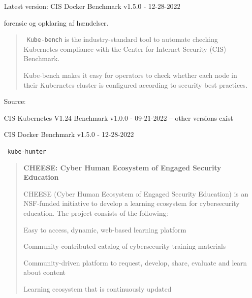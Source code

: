 \documentclass[Screen16to9,17pt]{foils}
\begin{document}
\begin{list2}
\item Latest version: CIS Docker Benchmark v1.5.0 - 12-28-2022
\end{list2}



\begin{list2}
\item
\end{list2}
forensic og opklaring af hændelser.



\begin{quote}
\faWrench\ \verb+Kube-bench+ is the industry-standard tool to automate checking Kubernetes compliance with the Center for Internet Security (CIS) Benchmark.

Kube-bench makes it easy for operators to check whether each node in their Kubernetes cluster is configured according to security best practices.
\end{quote}
Source: 

\begin{list2}
\item CIS Kubernetes V1.24 Benchmark v1.0.0 - 09-21-2022 -- other versions exist
\item CIS Docker Benchmark v1.5.0 - 12-28-2022
\end{list2}



\faWrench\ \verb+kube-hunter+



\begin{quote}
{\bf CHEESE: Cyber Human Ecosystem of Engaged Security Education}

CHEESE (Cyber Human Ecosystem of Engaged Security Education) is an NSF-funded initiative to develop a learning ecosystem for cybersecurity education. The project consists of the following:

\begin{list2}
\item Easy to access, dynamic, web-based learning platform
\item Community-contributed catalog of cybersecurity training materials
\item Community-driven platform to request, develop, share, evaluate and learn about content
\item Learning ecosystem that is continuously updated
\end{list2}
\end{quote}
\end{document}
